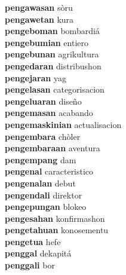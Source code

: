 \textbf{pengawasan } sòru \\
\textbf{pengawetan } kura \\
\textbf{pengeboman } bombardiá \\
\textbf{pengebumian } entiero \\
\textbf{pengebunan } agrikultura \\
\textbf{pengedaran } distribushon \\
\textbf{pengejaran } yag \\
\textbf{pengelasan } categorisacion \\
\textbf{pengeluaran } diseño \\
\textbf{pengemasan } acabando \\
\textbf{pengemaskinian } actualisacion \\
\textbf{pengembara } chòler \\
\textbf{pengembaraan } aventura \\
\textbf{pengempang } dam \\
\textbf{pengenal } caracteristico \\
\textbf{pengenalan } debut \\
\textbf{pengendali } direktor \\
\textbf{pengepungan } blokeo \\
\textbf{pengesahan } konfirmashon \\
\textbf{pengetahuan } konosementu \\
\textbf{pengetua } hefe \\
\textbf{penggal } dekapitá \\
\textbf{penggali } bor \\
